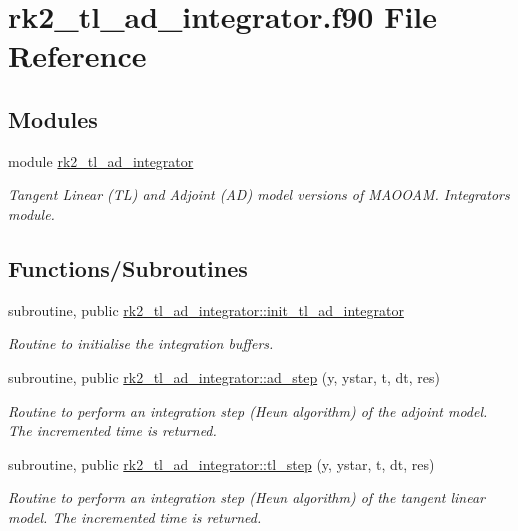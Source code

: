 \hypertarget{rk2__tl__ad__integrator_8f90}{}\section{rk2\+\_\+tl\+\_\+ad\+\_\+integrator.\+f90 File Reference}
\label{rk2__tl__ad__integrator_8f90}
\subsection*{Modules}
\begin{DoxyCompactItemize}
\item 
module \hyperlink{namespacerk2__tl__ad__integrator}{rk2\+\_\+tl\+\_\+ad\+\_\+integrator}
\begin{DoxyCompactList}\small\item\em Tangent Linear (TL) and Adjoint (AD) model versions of M\+A\+O\+O\+AM. Integrators module. \end{DoxyCompactList}\end{DoxyCompactItemize}
\subsection*{Functions/\+Subroutines}
\begin{DoxyCompactItemize}
\item 
subroutine, public \hyperlink{namespacerk2__tl__ad__integrator_a6fc4fb602b29384a3e7323e73d6cc123}{rk2\+\_\+tl\+\_\+ad\+\_\+integrator\+::init\+\_\+tl\+\_\+ad\+\_\+integrator}
\begin{DoxyCompactList}\small\item\em Routine to initialise the integration buffers. \end{DoxyCompactList}\item 
subroutine, public \hyperlink{namespacerk2__tl__ad__integrator_a2f42368825b617949c823d8bac3cac81}{rk2\+\_\+tl\+\_\+ad\+\_\+integrator\+::ad\+\_\+step} (y, ystar, t, dt, res)
\begin{DoxyCompactList}\small\item\em Routine to perform an integration step (Heun algorithm) of the adjoint model. The incremented time is returned. \end{DoxyCompactList}\item 
subroutine, public \hyperlink{namespacerk2__tl__ad__integrator_a47f17f39dfcac4d00f93bf4f8b3b3d0a}{rk2\+\_\+tl\+\_\+ad\+\_\+integrator\+::tl\+\_\+step} (y, ystar, t, dt, res)
\begin{DoxyCompactList}\small\item\em Routine to perform an integration step (Heun algorithm) of the tangent linear model. The incremented time is returned. \end{DoxyCompactList}\end{DoxyCompactItemize}
